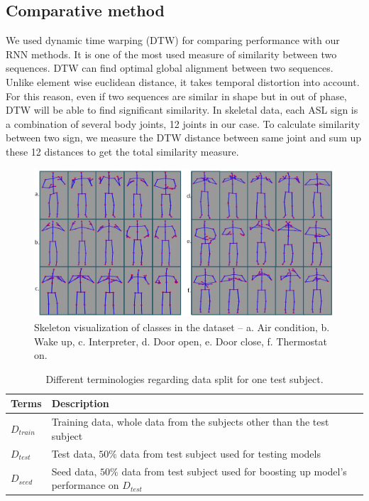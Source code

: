 \documentclass[10pt,twocolumn,letterpaper]{article}
\begin{document}
\subsection{Comparative method}
We used dynamic time warping (DTW) for comparing performance with our RNN methods. It is one of the most used measure of similarity between two sequences. DTW can find optimal global alignment between two sequences. Unlike element wise euclidean distance, it takes temporal distortion into account. For this reason, even if two sequences are similar in shape but in out of phase, DTW will be able to find significant similarity. In skeletal data, each ASL sign is a combination of several body joints, 12 joints in our case. To calculate similarity between two sign, we measure the DTW distance between same joint and sum up these 12 distances to get the total similarity measure.
\begin{figure}
	\begin{center}
		\includegraphics[width=.8\linewidth]{sk_data_viz}
	\end{center}
	\caption{Skeleton visualization of classes in the dataset -- a. Air condition, b. Wake up, c. Interpreter, d. Door open, e. Door close, f. Thermostat on.}
	\label{fig:sk_dat_viz}
\end{figure}


\begin{table}[h]
	\begin{center}
		\begin{tabular}{|m{1cm}|m{5cm}|}
			\hline
			Terms & Description\\
			\hline\hline
			$D_{train}$ & Training data, whole data from the subjects other than the test subject \\
			\hline
			$D_{test}$ & Test data, $50\%$ data from test subject used for testing models\\
			\hline
			$D_{seed}$ & Seed data, $50\%$ data from test subject used for boosting up model's performance on $D_{test}$\\
			\hline
		\end{tabular}
	\end{center}
	\caption{Different terminologies regarding data split for one test subject.}
	\label{table:terminology_eval}
\end{table}
\end{document}

